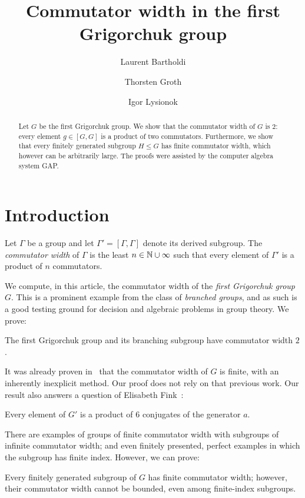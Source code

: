\documentclass[a4paper,11pt]{amsart}
\begin{document}
\title{Commutator width in the first Grigorchuk group}
\author{Laurent Bartholdi}
\author{Thorsten Groth}
\author{Igor Lysionok}
\begin{abstract}
  Let $G$ be the first Grigorchuk group.  We show that the commutator
  width of $G$ is $2$: every element $g\in [G,G]$ is a product of two
  commutators. Furthermore, we show that every finitely generated
  subgroup $H\leq G$ has finite commutator width, which however can be
  arbitrarily large. The proofs were assisted by the computer algebra
  system GAP.
\end{abstract}
\maketitle

\section{Introduction}
Let $\Gamma$ be a group and let $\Gamma'=[\Gamma,\Gamma]$ denote its
derived subgroup. The \emph{commutator width} of $\Gamma$ is the least
$n\in \mathbb{N}\cup \infty$ such that every element of $\Gamma'$ is a
product of $n$ commutators.

We compute, in this article, the commutator width of the \emph{first
  Grigorchuk group} $G$. This is a prominent example from the class of
\emph{branched groups}, and as such is a good testing ground for
decision and algebraic problems in group theory. We prove:
\begin{thma}\label{thm:CWGrigorchukGroup}
  The first Grigorchuk group and its branching subgroup have
  commutator width $2$.
\end{thma}
It was already proven in~\cite{Lysenok:QudraticEquationsInGrig} that
the commutator width of $G$ is finite, with an inherently inexplicit
method. Our proof does not rely on that previous work. Our result also
answers a question of Elisabeth
Fink~\cite[Question~3]{Fink:Conjugacy_growth}:
\begin{cora}\label{cor:productOf6Conjugates}
  Every element of $G'$ is a product of $6$ conjugates of the
  generator $a$.
\end{cora}

There are examples of groups of finite commutator width with subgroups
of infinite commutator width; and even finitely presented, perfect
examples in which the subgroup has finite index. However, we can
prove:
\begin{thma}\label{thm:subgroups}
  Every finitely generated subgroup of $G$ has finite commutator
  width; however, their commutator width cannot be bounded, even among
  finite-index subgroups.
\end{thma}
\end{document}
